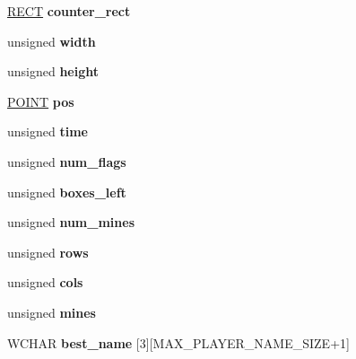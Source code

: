 \begin{DoxyCompactItemize}
\hyperlink{structtag_r_e_c_t}{R\+E\+CT} {\bfseries counter\+\_\+rect}
\item 
\mbox{\label{structtag_b_o_a_r_d_a2e049b02f420e03a9c9db2a64cc9c2ad}} 
unsigned {\bfseries width}
\item 
\mbox{\label{structtag_b_o_a_r_d_a8274decd490781cb514c5c76f8da8888}} 
unsigned {\bfseries height}
\item 
\mbox{\label{structtag_b_o_a_r_d_aefe9673b074a22a1b8196570be66f421}} 
\hyperlink{structtag_p_o_i_n_t}{P\+O\+I\+NT} {\bfseries pos}
\item 
\mbox{\label{structtag_b_o_a_r_d_ab218f4a6d176427d052c3c1b60436321}} 
unsigned {\bfseries time}
\item 
\mbox{\label{structtag_b_o_a_r_d_abb28722b4e14e26600c42ba199ab66c1}} 
unsigned {\bfseries num\+\_\+flags}
\item 
\mbox{\label{structtag_b_o_a_r_d_a32da87b34745db02f19e539713a99799}} 
unsigned {\bfseries boxes\+\_\+left}
\item 
\mbox{\label{structtag_b_o_a_r_d_ab97b65631e2796944fb7bbf9f41945b4}} 
unsigned {\bfseries num\+\_\+mines}
\item 
\mbox{\label{structtag_b_o_a_r_d_ab70cb6479b1216ad41e0d3f890dc179d}} 
unsigned {\bfseries rows}
\item 
\mbox{\label{structtag_b_o_a_r_d_a7ccd285a05078e165b7f2ecb2c0c71e9}} 
unsigned {\bfseries cols}
\item 
\mbox{\label{structtag_b_o_a_r_d_a8fc7b2ad314db1ede46b2b79ca7294ca}} 
unsigned {\bfseries mines}
\item 
\mbox{\label{structtag_b_o_a_r_d_ae756c31761bcfde4fd365ee4254cde49}} 
W\+C\+H\+AR {\bfseries best\+\_\+name} \mbox{[}3\mbox{]}\mbox{[}M\+A\+X\+\_\+\+P\+L\+A\+Y\+E\+R\+\_\+\+N\+A\+M\+E\+\_\+\+S\+I\+ZE+1\mbox{]}
\item 

\end{DoxyCompactItemize}
